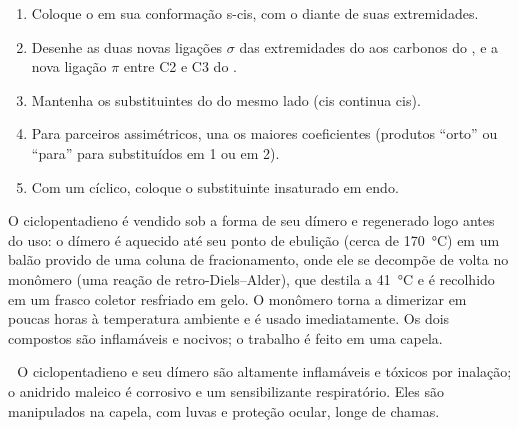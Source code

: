 \begin{method}\label{met:b2:frontier-orbitals:diels-alder}
\begin{enumerate}
  \item Coloque o  em sua conformação s-cis, com o  diante de
        suas extremidades.
  \item Desenhe as duas novas ligações $\sigma$ das extremidades do  aos
        carbonos do , e a nova ligação $\pi$ entre C2 e C3 do .
  \item Mantenha os substituintes do  do mesmo lado (cis continua cis).
  \item Para parceiros assimétricos, una os maiores coeficientes (produtos
        ``orto'' ou ``para'' para  substituídos em 1 ou em 2).
  \item Com um  cíclico, coloque o substituinte insaturado em endo.
\end{enumerate}
\end{method}

\begin{inthelab}
O ciclopentadieno é vendido sob a forma de seu dímero e regenerado logo antes
do uso: o dímero é aquecido até seu ponto de ebulição (cerca de
\qty{170}{\degreeCelsius}) em um balão provido de uma coluna de
fracionamento, onde ele se decompõe de volta no monômero (uma reação de
retro-Diels--Alder), que destila a \qty{41}{\degreeCelsius} e é recolhido em um
frasco coletor resfriado em gelo. O monômero torna a dimerizar em poucas horas
à temperatura ambiente e é usado imediatamente. Os dois compostos são
inflamáveis e nocivos; o trabalho é feito em uma capela.
\end{inthelab}

\begin{safety}{\,\,}
O ciclopentadieno e seu dímero são altamente inflamáveis e tóxicos por inalação;
o anidrido maleico é corrosivo e um sensibilizante respiratório. Eles são
manipulados na capela, com luvas e proteção ocular, longe de chamas.
\end{safety}

